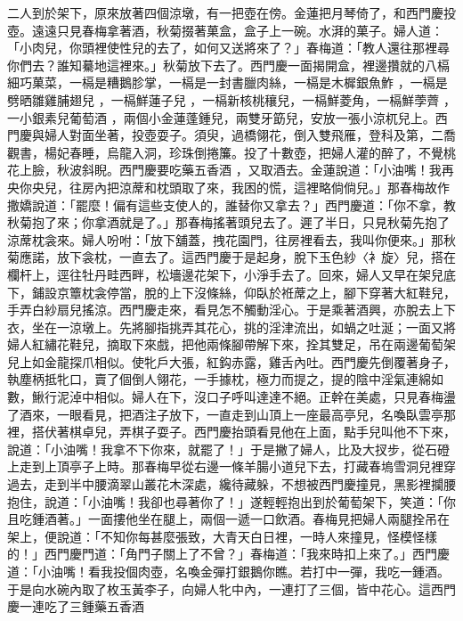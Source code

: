 二人到於架下，原來放著四個涼墩，有一把壺在傍。金蓮把月琴倚了，和西門慶投壺。遠遠只見春梅拿著酒，秋菊掇著菓盒，盒子上一碗。水湃的菓子。婦人道：「小肉兒，你頭裡使性兒的去了，如何又送將來了？」春梅道：「教人還往那裡尋你們去？誰知驀地這裡來。」秋菊放下去了。西門慶一面揭開盒，裡邊攢就的八槅細巧菓菜，一槅是糟鵝胗掌，一槅是一封書臘肉絲，一槅是木樨銀魚鮓 ，一槅是劈晒雛雞脯翅兒 ，一槅鮮蓮子兒 ，一槅新核桃穰兒，一槅鮮菱角，一槅鮮荸薺 ，一小銀素兒葡萄酒 ，兩個小金蓮蓬鍾兒，兩雙牙筯兒，安放一張小涼杌兒上。西門慶與婦人對面坐著，投壺耍子。須臾，過橋翎花，倒入雙飛雁，登科及第，二喬觀書，楊妃春睡，烏龍入洞，珍珠倒捲簾。投了十數壺，把婦人灌的醉了，不覺桃花上臉，秋波斜睨。西門慶要吃藥五香酒 ，又取酒去。金蓮說道：「小油嘴！我再央你央兒，往房內把涼蓆和枕頭取了來，我困的慌，這裡略倘倘兒。」那春梅故作撒嬌說道：「罷麼！偏有這些支使人的，誰替你又拿去？」西門慶道：「你不拿，教秋菊抱了來；你拿酒就是了。」那春梅搖著頭兒去了。遲了半日，只見秋菊先抱了涼蓆枕衾來。婦人吩咐：「放下舖蓋，拽花園門，往房裡看去，我叫你便來。」那秋菊應諾，放下衾枕，一直去了。這西門慶于是起身，脫下玉色紗〈衤旋〉兒，搭在欄杆上，逕往牡丹畦西畔，松墻邊花架下，小淨手去了。回來，婦人又早在架兒底下，鋪設京簟枕衾停當，脫的上下沒條絲，仰臥於袵蓆之上，腳下穿著大紅鞋兒，手弄白紗扇兒搖涼。西門慶走來，看見怎不觸動淫心。于是乘著酒興，亦脫去上下衣，坐在一涼墩上。先將腳指挑弄其花心，挑的淫津流出，如蝸之吐涎；一面又將婦人紅繡花鞋兒，摘取下來戲，把他兩條腳帶解下來，拴其雙足，吊在兩邊葡萄架兒上如金龍探爪相似。使牝戶大張，紅鈎赤露，雞舌內吐。西門慶先倒覆著身子，執塵柄抵牝口，賣了個倒人翎花，一手據枕，極力而提之，提的陰中淫氣連綿如數，鰍行泥淖中相似。婦人在下，沒口子呼叫達達不絕。正幹在美處，只見春梅盪了酒來，一眼看見，把酒注子放下，一直走到山頂上一座最高亭兒，名喚臥雲亭那裡，搭伏著棋卓兒，弄棋子耍子。西門慶抬頭看見他在上面，點手兒叫他不下來，說道：「小油嘴！我拿不下你來，就罷了！」于是撇了婦人，比及大扠步，從石磴上走到上頂亭子上時。那春梅早從右邊一條羊腸小道兒下去，打藏春塢雪洞兒裡穿過去，走到半中腰滴翠山叢花木深處，纔待藏躲，不想被西門慶撞見，黑影裡攔腰抱住，說道：「小油嘴！我卻也尋著你了！」遂輕輕抱出到於葡萄架下，笑道：「你且吃鍾酒著。」一面摟他坐在腿上，兩個一遞一口飲酒。春梅見把婦人兩腿拴吊在架上，便說道：「不知你每甚麼張致，大青天白日裡，一時人來撞見，怪模怪樣的！」西門慶門道：「角門子關上了不曾？」春梅道：「我來時扣上來了。」西門慶道：「小油嘴！看我投個肉壺，名喚金彈打銀鵝你瞧。若打中一彈，我吃一鍾酒。于是向水碗內取了枚玉黃李子，向婦人牝中內，一連打了三個，皆中花心。這西門慶一連吃了三鍾藥五香酒 